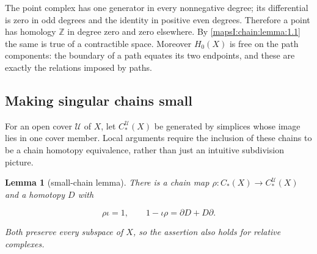 \documentclass[11pt]{article}
\newtheorem{lemma}[theorem]{Lemma}
\begin{document}
The point complex has one generator in every nonnegative degree; its differential is zero in odd degrees and the identity in positive even degrees. Therefore a point has homology \(\mathbb Z\) in degree zero and zero elsewhere. By \cref{mapsI:chain:lemma:1.1} the same is true of a contractible space. Moreover \(H_0(X)\) is free on the path components: the boundary of a path equates its two endpoints, and these are exactly the relations imposed by paths.

\subsection{Making singular chains small}
\label{mapsI:chain:section-2}

For an open cover \(\mathcal U\) of \(X\), let \(C_*^{\mathcal U}(X)\) be generated by simplices whose image lies in one cover member. Local arguments require the inclusion of these chains to be a chain homotopy equivalence, rather than just an intuitive subdivision picture.

\begin{lemma}[small-chain lemma]
\label{mapsI:chain:lemma:2.1}
There is a chain map \(\rho:C_*(X)\to C_*^{\mathcal U}(X)\) and a homotopy \(D\) with

\[
\rho\iota=1,\qquad 1-\iota\rho=\partial D+D\partial.
\]

Both preserve every subspace of \(X\), so the assertion also holds for relative complexes.
\end{lemma}
\end{document}
